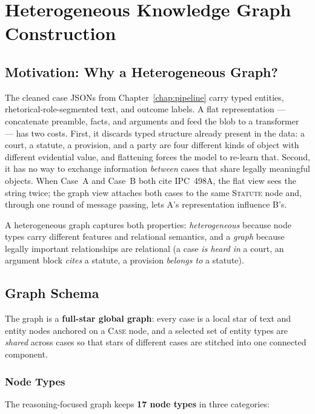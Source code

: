 \chapter{Heterogeneous Knowledge Graph Construction}
\label{chap:kg}

\section{Motivation: Why a Heterogeneous Graph?}
\label{sec:kg_motivation}

The cleaned case JSONs from Chapter~\ref{chap:pipeline} carry typed entities, rhetorical-role-segmented text, and outcome labels. A flat representation --- concatenate preamble, facts, and arguments and feed the blob to a transformer --- has two costs. First, it discards typed structure already present in the data: a court, a statute, a provision, and a party are four different kinds of object with different evidential value, and flattening forces the model to re-learn that. Second, it has no way to exchange information \emph{between} cases that share legally meaningful objects. When Case~A and Case~B both cite IPC~498A, the flat view sees the string twice; the graph view attaches both cases to the same \textsc{Statute} node and, through one round of message passing, lets A's representation influence B's.

A heterogeneous graph captures both properties: \emph{heterogeneous} because node types carry different features and relational semantics, and a \emph{graph} because legally important relationships are relational (a case \emph{is heard in} a court, an argument block \emph{cites} a statute, a provision \emph{belongs to} a statute).

\section{Graph Schema}
\label{sec:graph_schema}

The graph is a \textbf{full-star global graph}: every case is a local star of text and entity nodes anchored on a \textsc{Case} node, and a selected set of entity types are \emph{shared} across cases so that stars of different cases are stitched into one connected component.

\subsection{Node Types}

The reasoning-focused graph keeps \textbf{17 node types} in three categories:

